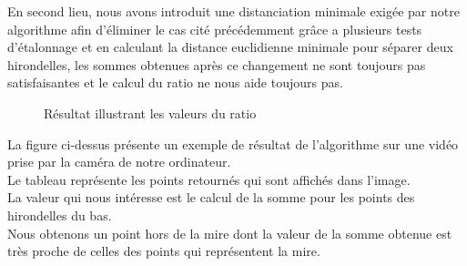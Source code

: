 \documentclass[12pt]{article}
\begin{document}
\begin{enumerate}
En second lieu, nous avons introduit une distanciation minimale exigée par notre algorithme afin d’éliminer le cas cité précédemment grâce a plusieurs tests d’étalonnage et en calculant la distance euclidienne minimale pour séparer deux hirondelles, les sommes obtenues après ce changement ne sont toujours pas satisfaisantes et le calcul du ratio ne nous aide toujours pas. \\
\begin{figure}[H]
    \centering
    \qquad
    \caption{Résultat illustrant les valeurs du ratio}
    \label{fig:ratio}
\end{figure}

La figure ci-dessus présente un exemple de résultat de l'algorithme sur une vidéo prise par la caméra de notre ordinateur.\\
Le tableau représente les points retournés qui sont affichés dans l'image.\\ La valeur qui nous intéresse est le calcul de la somme pour les points des hirondelles du bas.\\
Nous obtenons un point hors de la mire dont la valeur de la somme obtenue est très proche de celles des points qui représentent la mire.\\


\end{enumerate}
\end{document}

